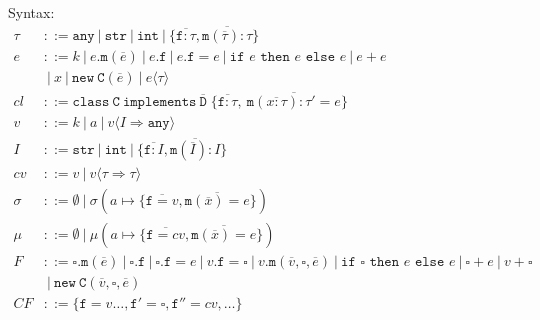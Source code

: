 \documentclass{report}
\begin{document}
\newcommand{\class}{\ensuremath{\xt{class}}\xspace}
\newcommand{\G}{\Gamma}
\renewcommand{\int}{\texttt{int}}
\newcommand{\coerce}{\Rightarrow} %
\newcommand{\str}{\texttt{str}}
\newcommand{\any}{\texttt{any}}   %
\newcommand{\this}{\texttt{this}}
\newcommand{\ifthenelse}[3]{\texttt{if }#1\texttt{ then }#2\texttt{ else }#3}
\newcommand{\cast}[1]{\langle #1\rangle} 
\newcommand{\xt}[1]{\texttt{#1}}
\newcommand{\creduce}{\longrightarrow_{cr}}  %
\newcommand{\ereduce}{\longrightarrow_{e}}   %
\newcommand{\stepsto}{\longrightarrow}        %
\newcommand{\intv}[1]{\xt{int}[#1]}
\newcommand{\strv}[1]{\xt{str}[#1]}
\newcommand{\tlate}{\rightsquigarrow}
\newcommand{\s}{\sigma}
\renewcommand{\sc}{\mu}
\renewcommand{\t}{\tau}
\newcommand{\B}{\ensuremath{~|~}\xspace}
\newcommand{\new}{\ensuremath{\texttt{new}}\xspace}
\newcommand{\NEW}[2]{\ensuremath{  \new ~ #1 ( #2 )}\xspace}
\renewcommand{\bar}[1]{\ensuremath{\overline{ #1} }\xspace}
\newcommand{\m}{\ensuremath{\xt{m}}\xspace}
\newcommand{\f}{\ensuremath{\xt{f}}\xspace}
\newcommand{\C}{\ensuremath{\xt{C}}\xspace}
\newcommand{\D}{\ensuremath{\xt{D}}\xspace}
\newcommand{\is}{\mapsto}
\newcommand{\cl}{\mathit{cl}\xspace}
\newcommand{\implements}{\xt{implements}\xspace}
\newcommand{\CLASS}[3]{ \ensuremath{  \xt{class}~#1~\implements~#2\;\{ #3 \}}\xspace} 
\newcommand{\MDEF}[4] { #1( #2 ):#3 = #4}
\newcommand{\MTYPE}[3] { #1( #2 ):#3}
\newcommand{\MVAL}[3] { #1( #2 ) = #3}
\newcommand{\Gdash}{\G\vdash}

Syntax:
\begin{align*}
\t &::= \any \B  \str \B  \int \B  \{\bar{\f :\t},\bar{\m (\bar{\t}):\t}\}\\
e &::= k \B  e.\m(\bar{e}) \B e.\f  \B e.\f  = e \B  \ifthenelse{e}{e}{e}\B e + e \\
&\B x\B \NEW \C {\bar{e}} \B  e\cast{\t}\\
\cl &::= \CLASS \C {\bar \D} { \bar{ \f : \t }, ~ \bar{ \MDEF{\m}{\bar{x :\t}}{\t'}{e} } } \\
v &::= k \B a \B  v\cast{I \coerce \any}\\
I &::= \str \B  \int \B  \{\bar{\f :I},\bar{\m (\bar{I}):I}\}\\
cv &::= v \B  v\cast{\t \coerce \t}\\
\s &::= \emptyset \B  \s( a \is \{\bar{\f=v},\bar{\m (\bar x)=e}\} )\\
\sc &::= \emptyset \B  \sc( a \is  \{\bar{\f=cv},\bar{ \MVAL\m{\bar x}e }\} )\\
F &::=    \square.\m(\bar e) 
   \B 	  \square.\f 
   \B 	  \square.\f  = e
   \B     v.\f  = \square
   \B     v.\m(\bar v,\square, \bar e) 
   \B     \ifthenelse{\square}{e}{e} 
   \B     \square + e 
   \B      v + \square\\
&\B \NEW  \C {\bar{v},\square,\bar{e}}\\
\mathit{CF} &::= \{\f=v\ldots,\f'=\square,\f''=cv,\ldots\}\\
\end{align*}
\end{document}
